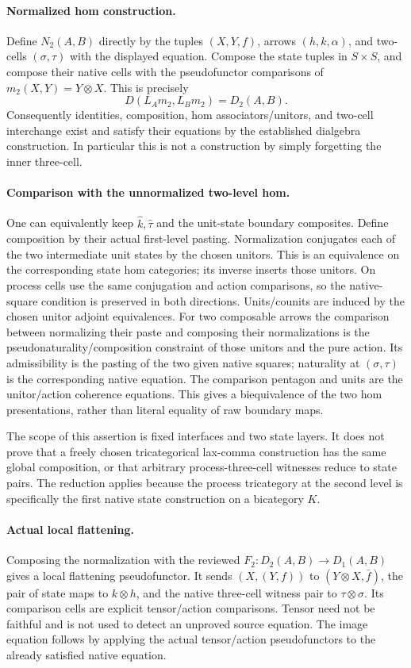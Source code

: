 \documentclass{article}
\begin{document}
\paragraph{Normalized hom construction.} Define $N_2(A,B)$ directly by the tuples $(X,Y,f)$, arrows $(h,k,\alpha)$, and two-cells $(\sigma,\tau)$ with the displayed equation. Compose the state tuples in $S\times S$, and compose their native cells with the pseudofunctor comparisons of $m_2(X,Y)=Y\otimes X$. This is precisely
\[
 D(L_A m_2,L_B m_2)=D_2(A,B).
\]
Consequently identities, composition, hom associators/unitors, and two-cell interchange exist and satisfy their equations by the established dialgebra construction. In particular this is not a construction by simply forgetting the inner three-cell.

\paragraph{Comparison with the unnormalized two-level hom.} One can equivalently keep $\widehat k,\widehat\tau$ and the unit-state boundary composites. Define composition by their actual first-level pasting. Normalization conjugates each of the two intermediate unit states by the chosen unitors. This is an equivalence on the corresponding state hom categories; its inverse inserts those unitors. On process cells use the same conjugation and action comparisons, so the native-square condition is preserved in both directions. Units/counits are induced by the chosen unitor adjoint equivalences. For two composable arrows the comparison between normalizing their paste and composing their normalizations is the pseudonaturality/composition constraint of those unitors and the pure action. Its admissibility is the pasting of the two given native squares; naturality at $(\sigma,\tau)$ is the corresponding native equation. The comparison pentagon and units are the unitor/action coherence equations. This gives a biequivalence of the two hom presentations, rather than literal equality of raw boundary maps.

The scope of this assertion is fixed interfaces and two state layers. It does not prove that a freely chosen tricategorical lax-comma construction has the same global composition, or that arbitrary process-three-cell witnesses reduce to state pairs. The reduction applies because the process tricategory at the second level is specifically the first native state construction on a bicategory $K$.

\paragraph{Actual local flattening.} Composing the normalization with the reviewed $F_2:D_2(A,B)\to D_1(A,B)$ gives a local flattening pseudofunctor. It sends $(X,(Y,f))$ to $(Y\otimes X,\bar f)$, the pair of state maps to $k\otimes h$, and the native three-cell witness pair to $\tau\otimes\sigma$. Its comparison cells are explicit tensor/action comparisons. Tensor need not be faithful and is not used to detect an unproved source equation. The image equation follows by applying the actual tensor/action pseudofunctors to the already satisfied native equation.
\end{document}
